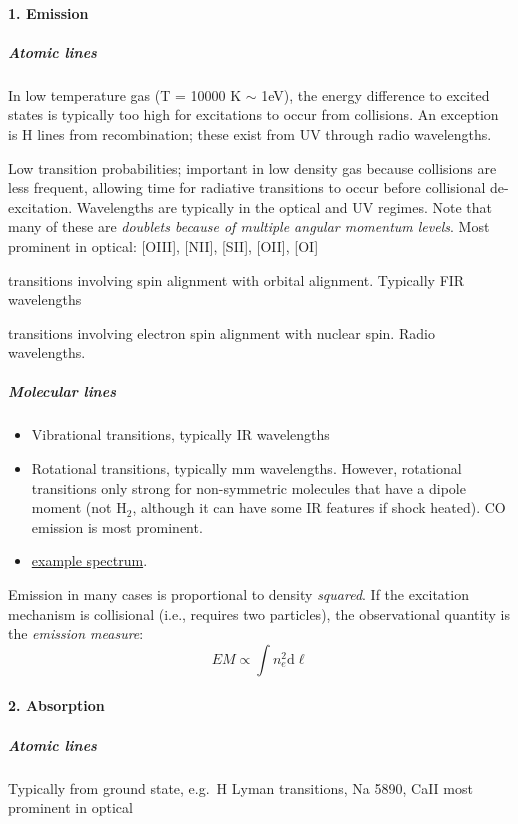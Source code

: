 \documentclass{article}
\begin{document}
\paragraph{1. Emission}
\subparagraph{Atomic lines}
\begin{description}[labelwidth=5em, leftmargin=8em ]
    \item [Permitted] In low temperature gas (T = 10000 K $\sim$ 1eV),
        the energy difference to excited states is typically too high
        for excitations to occur from collisions. An exception is
        H lines from recombination; these exist from UV through radio
        wavelengths.
    \item [``Forbidden''] Low transition probabilities; important in low
        density gas because collisions are less frequent, allowing time
        for radiative transitions to occur before collisional de-excitation.
        Wavelengths are typically in the optical and UV regimes. Note that
        many of these are \textit{doublets because of multiple angular momentum
        levels}. Most prominent in optical: [OIII], [NII], [SII], [OII], [OI]
    \item [Fine-structure] transitions involving spin alignment with
        orbital alignment. Typically FIR wavelengths
    \item [Hyperfine-structure] transitions involving electron spin
        alignment with nuclear spin. Radio wavelengths.
\end{description}
\subparagraph{Molecular lines}
\begin{itemize}
    \item Vibrational transitions, typically IR wavelengths
    \item Rotational transitions, typically mm wavelengths. However,
        rotational transitions only strong for non-symmetric molecules
        that have a dipole moment (not H$_{2}$, although it can have
        some IR features if shock heated). CO emission is most prominent.
    \item \href{http://astronomy.nmsu.edu/holtz/a555/resources/irism.gif}
        {example spectrum}.
\end{itemize}
Emission in many cases is proportional to density \emph{squared}.
If the excitation mechanism is collisional (i.e., requires two particles),
the observational quantity is the \textit{emission measure}:
\[
    EM \propto \int{n_{e}^{2}\mathrm{d}\ell}
    \]

\paragraph{2. Absorption}
\subparagraph{Atomic lines}
Typically from ground state, e.g.\ H Lyman transitions, Na 5890, CaII
most prominent in optical
\end{document}
